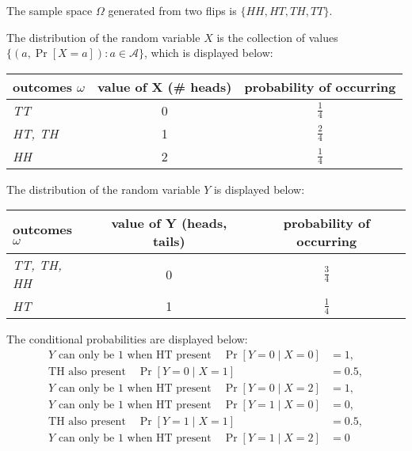 \documentclass[11pt]{article}
\begin{document}
\begin{solution}

\begin{Parts}
    
\Part The sample space $\Omega$ generated from two flips is $\{HH, HT, TH, TT \}$.

\Part The distribution of the random variable $X$ is the collection of values
$\{(a, \Pr[X=a]):a \in \mathcal{A} \}$, which is displayed below:
\begin{center}
    \begin{tabular}{|>{\centering\arraybackslash}m{6cm}|c|c|}
    \hline
    \textbf{outcomes $\omega$} & \textbf{value of X (\# heads)} & 
    \textbf{probability of occurring} \\
    \hline
    \textit{TT} & 0 & $\frac{1}{4}$ \\
    \hline
    \textit{HT, TH} & 1 & $\frac{2}{4}$ \\
    \hline
    \textit{HH} & 2 & $\frac{1}{4}$ \\
    \hline
    \end{tabular}
\end{center}

\Part The distribution of the random variable $Y$ is displayed below:
\begin{center}
    \begin{tabular}{|>{\centering\arraybackslash}m{6cm}|c|c|}
    \hline
    \textbf{outcomes $\omega$} & \textbf{value of Y (heads, tails)} & 
    \textbf{probability of occurring} \\
    \hline
    \textit{TT, TH, HH} & 0 & $\frac{3}{4}$ \\
    \hline
    \textit{HT} & 1 & $\frac{1}{4}$ \\
    \hline
    \end{tabular}
\end{center}

\Part The conditional probabilities are displayed below:
\begin{align*}
    \text{$Y$ can only be 1 when HT present} \quad \Pr[Y = 0 \mid X = 0] &= 1, \\
    \text{TH also present} \quad \Pr[Y = 0 \mid X = 1] &= 0.5, \\
    \text{$Y$ can only be 1 when HT present} \quad \Pr[Y = 0 \mid X = 2] &= 1, \\
    \text{$Y$ can only be 1 when HT present} \quad \Pr[Y = 1 \mid X = 0] &= 0, \\
    \text{TH also present} \quad \Pr[Y = 1 \mid X = 1] &= 0.5, \\
    \text{$Y$ can only be 1 when HT present} \quad \Pr[Y = 1 \mid X = 2] &= 0
\end{align*}


\end{Parts}
\end{solution}
\end{document}
